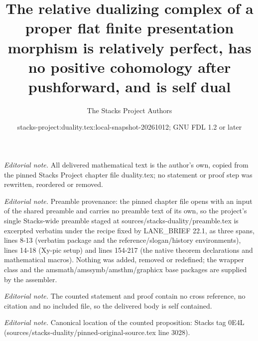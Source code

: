 \documentclass[10pt,a4paper]{amsart}
\title{The relative dualizing complex of a proper flat finite presentation morphism is relatively perfect, has no positive cohomology after pushforward, and is self dual}
\author{The Stacks Project Authors}
\date{stacks-project:duality.tex:local-snapshot-20261012; GNU FDL 1.2 or later}
\theoremstyle{plain}
\theoremstyle{definition}
\theoremstyle{remark}
\numberwithin{equation}{subsection}
\begin{document}
\maketitle
\noindent\textit{Editorial note.} All delivered mathematical text is the author's own, copied from the pinned Stacks Project chapter file duality.tex; no statement or proof step was rewritten, reordered or removed.\par\medskip
\noindent\textit{Editorial note.} Preamble provenance: the pinned chapter file opens with an input of the shared preamble and carries no preamble text of its own, so the project's single Stacks-wide preamble staged at sources/stacks-duality/preamble.tex is excerpted verbatim under the recipe fixed by LANE\_BRIEF 22.1, as three spans, lines 8-13 (verbatim package and the reference/slogan/history environments), lines 14-18 (Xy-pic setup) and lines 154-217 (the native theorem declarations and mathematical macros). Nothing was added, removed or redefined; the wrapper class and the amsmath/amssymb/amsthm/graphicx base packages are supplied by the assembler.\par\medskip
\noindent\textit{Editorial note.} The counted statement and proof contain no cross reference, no citation and no included file, so the delivered body is self contained.\par\medskip
\noindent\textit{Editorial note.} Canonical location of the counted proposition: Stacks tag 0E4L (sources/stacks-duality/pinned-original-source.tex line 3028).\par\medskip
\end{document}
